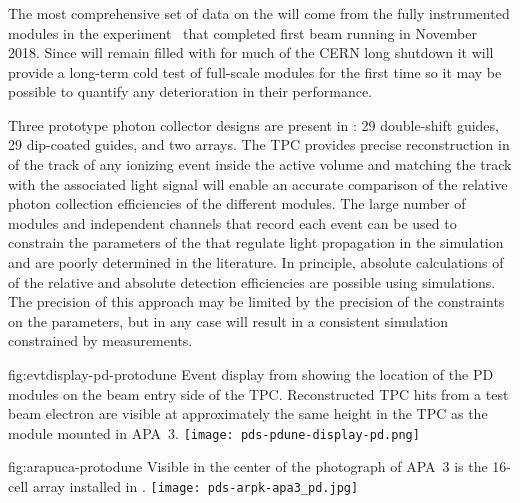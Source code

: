 \subsubsection{}
\label{sec:valid-pdsp}



The most comprehensive set of data on the  will come from the fully instrumented modules in the  experiment~\cite{Abi:2017aow} that completed first beam running in November \num{2018}. 
Since  will remain filled with \lar for much of the CERN long shutdown it will provide a long-term cold test of full-scale  modules for the first time so it may be possible to quantify any deterioration in their performance.


Three prototype photon collector designs are present in : \num{29} double-shift guides, \num{29} dip-coated guides, and two  arrays.
The TPC provides precise reconstruction in \threed of the track of any ionizing event inside the active volume and matching the track with the associated light signal will enable an accurate comparison of the relative photon collection efficiencies of the different  modules. 
The large number of modules and independent channels that record each event can be used to constrain the parameters of the \lar that regulate  light propagation in the simulation and are poorly determined in the literature. %
In principle, absolute calculations of of the relative and absolute detection efficiencies are possible using  simulations.
The precision of this approach may be limited by the precision of the constraints on the parameters, but in any case will result in a consistent simulation constrained by measurements. 


\begin{dunefigure}{fig:evtdisplay-pd-protodune}
{Event display from  showing the location of the PD modules on the beam entry side of the TPC. Reconstructed TPC hits from a test beam electron are visible at approximately the same height in the TPC as the  module mounted in APA~3.} 
\texttt{[image: pds-pdune-display-pd.png]}
\end{dunefigure}

\begin{dunefigure}{fig:arapuca-protodune}
{Visible in the center of the photograph of APA~3 is the 16-cell  array installed in .} 
\texttt{[image: pds-arpk-apa3\_pd.jpg]} 
\end{dunefigure}

